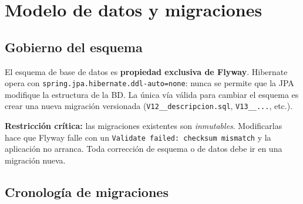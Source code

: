 \documentclass[11pt,a4paper,oneside]{article}
\newcommand{\code}[1]{\texttt{\small #1}}
\begin{document}
\section{Modelo de datos y migraciones}

\subsection{Gobierno del esquema}

El esquema de base de datos es \textbf{propiedad exclusiva de Flyway}. Hibernate opera con
\code{spring.jpa.hibernate.ddl-auto=none}: nunca se permite que la JPA modifique la estructura
de la BD. La única vía válida para cambiar el esquema es crear una nueva migración versionada
(\code{V12\_\_descripcion.sql}, \code{V13\_\_...}, etc.).

\begin{ataraAlerta}
\textbf{Restricción crítica:} las migraciones existentes son \emph{inmutables}. Modificarlas
hace que Flyway falle con un \code{Validate failed: checksum mismatch} y la aplicación no arranca.
Toda corrección de esquema o de datos debe ir en una migración nueva.
\end{ataraAlerta}

\subsection{Cronología de migraciones}
\end{document}
